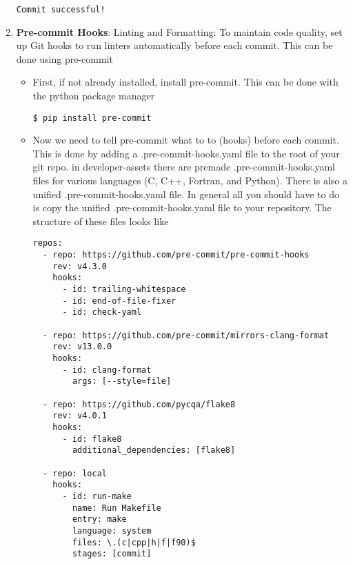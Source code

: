 \documentclass{ol-softwaremanual}
\begin{document}
\begin{enumerate}
\begin{terminal}
\texttt{\color{green}Commit successful!}
\end{terminal}
\item \textbf{Pre-commit Hooks}: Linting and Formatting: To maintain code quality, set up Git hooks to run linters automatically before each commit. This can be done using pre-commit
\begin{itemize}
\item First, if not already installed, install pre-commit. This can be done with the python package manager
\begin{terminal}
\begin{verbatim}
$ pip install pre-commit
\end{verbatim}
\end{terminal}
\item Now we need to tell pre-commit what to to (hooks) before each commit. This is done by adding a .pre-commit-hooks.yaml file to the root of your git repo. in developer-assets there are premade .pre-commit-hooks.yaml files for various languages (C, C++, Fortran, and Python). There is also a unified .pre-commit-hooks.yaml file. In general all you should have to do is copy the unified .pre-commit-hooks.yaml file to your repository. The structure of these files looks like

\begin{verbatim}
repos:
  - repo: https://github.com/pre-commit/pre-commit-hooks
    rev: v4.3.0
    hooks:
      - id: trailing-whitespace
      - id: end-of-file-fixer
      - id: check-yaml

  - repo: https://github.com/pre-commit/mirrors-clang-format
    rev: v13.0.0
    hooks:
      - id: clang-format
        args: [--style=file]

  - repo: https://github.com/pycqa/flake8
    rev: v4.0.1
    hooks:
      - id: flake8
        additional_dependencies: [flake8]

  - repo: local
    hooks:
      - id: run-make
        name: Run Makefile
        entry: make
        language: system
        files: \.(c|cpp|h|f|f90)$
        stages: [commit]


\end{verbatim}
\end{itemize}
\end{enumerate}
\end{document}
